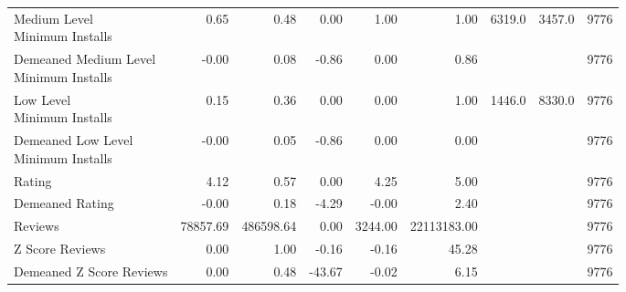 \begin{table}[h!]
\begin{tabular}{lrrrrrrrr}
\makecell[l]{Medium Level \\ Minimum Installs}          &  0.65 &  0.48 &  0.00 &  1.00 &  1.00 &  6319.0 &  3457.0 &  9776 \\
\makecell[l]{Demeaned Medium Level \\ Minimum Installs} & -0.00 &  0.08 & -0.86 &  0.00 &  0.86 & {} & {} &  9776 \\
\makecell[l]{Low Level \\ Minimum Installs}             &  0.15 &  0.36 &  0.00 &  0.00 &  1.00 &  1446.0 &  8330.0 &  9776 \\
\makecell[l]{Demeaned Low Level \\ Minimum Installs}    & -0.00 &  0.05 & -0.86 &  0.00 &  0.00 & {} & {} &  9776 \\
Rating                                                  &  4.12 &  0.57 &  0.00 &  4.25 &  5.00 & {} & {} &  9776 \\
Demeaned Rating                                         & -0.00 &  0.18 & -4.29 & -0.00 &  2.40 & {} & {} &  9776 \\
Reviews                                                 &  78857.69 &  486598.64 &  0.00 &  3244.00 &  22113183.00 & {} & {} &  9776 \\
Z Score Reviews                                         &  0.00 &  1.00 & -0.16 & -0.16 &  45.28 & {} & {} &  9776 \\
Demeaned Z Score Reviews                                &  0.00 &  0.48 & -43.67 & -0.02 &  6.15 & {} & {} &  9776 \\
\bottomrule
\end{tabular}
\end{table}

